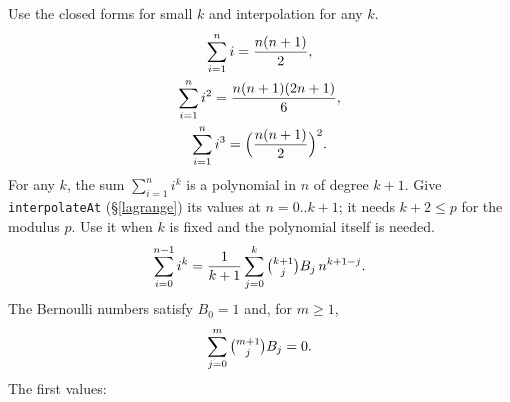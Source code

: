 {\footnotesize\tightdisplay
{}
Use the closed forms for small $k$ and interpolation for any $k$.
\begin{gather*} \sum_{i=1}^{n} i = \frac{n(n+1)}{2}, \\ \sum_{i=1}^{n} i^2 = \frac{n(n+1)(2n+1)}{6}, \\ \sum_{i=1}^{n} i^3 = \Bigl(\frac{n(n+1)}{2}\Bigr)^2. \end{gather*}
For any $k$, the sum $\sum_{i=1}^{n} i^k$ is a polynomial in $n$ of degree $k + 1$.
Give \texttt{interpolateAt} (\S\ref{lagrange}) its values at $n = 0..k+1$; it needs $k + 2 \le p$ for the modulus $p$.
Use it when $k$ is fixed and the polynomial itself is needed.
\[ \sum_{i=0}^{n-1} i^k = \frac{1}{k+1} \sum_{j=0}^{k} \tbinom{k+1}{j} B_j\, n^{k+1-j}. \]
The Bernoulli numbers satisfy $B_0 = 1$ and, for $m \ge 1$,
\[ \sum_{j=0}^{m} \tbinom{m+1}{j} B_j = 0. \]
The first values:

}
